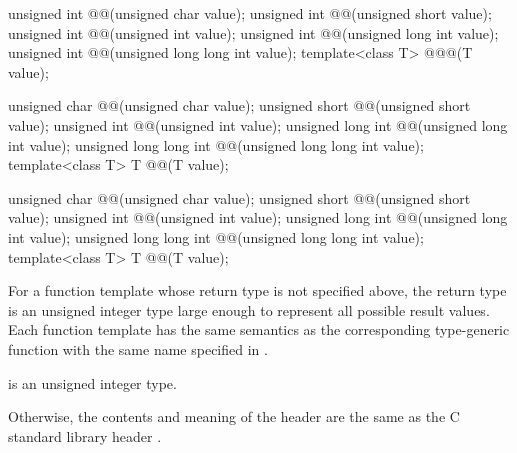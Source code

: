 \begin{codeblock}
unsigned int @@(unsigned char value);
unsigned int @@(unsigned short value);
unsigned int @@(unsigned int value);
unsigned int @@(unsigned long int value);
unsigned int @@(unsigned long long int value);
template<class T> @\seebelow@ @@(T value);

unsigned char @@(unsigned char value);
unsigned short @@(unsigned short value);
unsigned int @@(unsigned int value);
unsigned long int @@(unsigned long int value);
unsigned long long int @@(unsigned long long int value);
template<class T> T @@(T value);

unsigned char @@(unsigned char value);
unsigned short @@(unsigned short value);
unsigned int @@(unsigned int value);
unsigned long int @@(unsigned long int value);
unsigned long long int @@(unsigned long long int value);
template<class T> T @@(T value);
\end{codeblock}

\pnum
For a function template whose return type is not specified above,
the return type is
an  unsigned integer type
large enough to represent all possible result values.
Each function template has the same semantics
as the corresponding type-generic function with the same name
specified in .

\pnum
\mandates
{} is an unsigned integer type.

\pnum
Otherwise,
the contents and meaning of the header  are the same as
the C standard library header .

